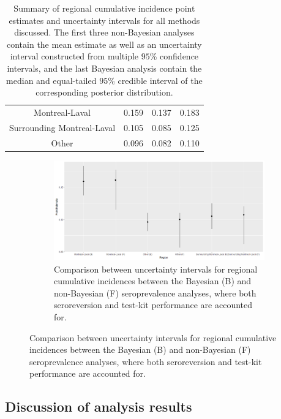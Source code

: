 \begin{table}[]
\begin{tabular}{c|ccc}
Montreal-Laval             & 0.159               & 0.137                  & 0.183                  \\
Surrounding Montreal-Laval & 0.105               & 0.085                  & 0.125                  \\
Other                      & 0.096               & 0.082                  & 0.110                 
\end{tabular}
\caption{Summary of regional cumulative incidence point estimates and uncertainty intervals for all methods discussed. The first three non-Bayesian analyses contain the mean estimate as well as an uncertainty interval constructed from multiple $95$\% confidence intervals, and the last Bayesian analysis contain the median and equal-tailed $95$\% credible interval of the corresponding posterior distribution.}
\end{table}

\captionsetup[subfigure]{labelformat=empty}
\begin{figure}[ht!]
\centering
\begin{subfigure}[b]{\columnwidth} 
    \includegraphics[width=\columnwidth]{../../plot/intervals.png}
    \caption{Comparison between uncertainty intervals for regional cumulative incidences between the Bayesian (B) and non-Bayesian (F) seroprevalence analyses, where both seroreversion and test-kit performance are accounted for.}
    \label{fig:intervals}
\end{subfigure}
\end{figure}

\subsection{Discussion of analysis results}